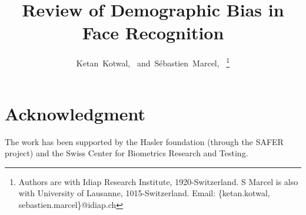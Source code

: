 \documentclass[journal]{IEEEtran}
\begin{document}
\title{Review of Demographic Bias in Face Recognition}

\author{Ketan~Kotwal,~
and~S{\'e}bastien~Marcel,~%
\thanks{Authors are with Idiap Research Institute, 1920-Switzerland. S Marcel is
also with University of Lausanne, 1015-Switzerland.
Email: \{ketan.kotwal, sebastien.marcel\}@idiap.ch}%
}
%

\maketitle
%
\begin{abstract}

\end{abstract}

%















\section*{Acknowledgment}
The work has been supported by the Hasler foundation (through the SAFER project)
and the Swiss Center for Biometrics Research and Testing.



\end{document}
